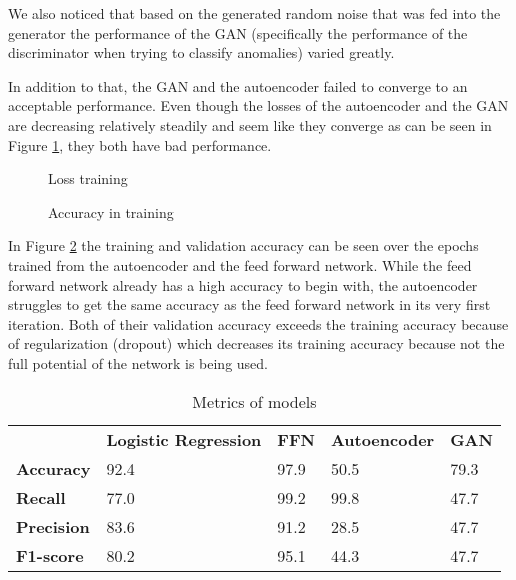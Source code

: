 \documentclass[]{article}
\begin{document}
	We also noticed that based on the generated random noise that was fed into the generator the performance of the GAN (specifically the performance of the discriminator when trying to classify anomalies) varied greatly. 
	\newline
	
	\noindent
	In addition to that, the GAN and the autoencoder failed to converge to an acceptable performance. Even though the losses of the autoencoder and the GAN are decreasing relatively steadily and seem like they converge as can be seen in Figure \ref{loss}, they both have bad performance.
	\newline
	
		\begin{figure}[!tbp]
		\centering
		\hfill
		\hfill
		\caption{Loss training}
		\label{loss}
	\end{figure}

	\begin{figure}[!tbp]
	\centering
	\hfill
	\caption{Accuracy in training}
	\label{accuracy}
	\end{figure}

	\noindent
	In Figure \ref{accuracy} the training and validation accuracy can be seen over the epochs trained from the autoencoder and the feed forward network. While the feed forward network already has a high accuracy to begin with, the autoencoder struggles to get the same accuracy as the feed forward network in its very first iteration. Both of their validation accuracy exceeds the training accuracy because of regularization (dropout) which decreases its training accuracy because not the full potential of the network is being used. 
	\newline
	
			\begin{table}[]
		\begin{tabular}{lllll}
			& \textbf{Logistic Regression} & \textbf{FFN} & \textbf{Autoencoder} & \textbf{GAN} \\
			\textbf{Accuracy}  & 92.4                       & 97.9        & 50.5             & 79.3      \\
			\textbf{Recall}    & 77.0                         & 99.2         & 99.8                 & 47.7        \\
			\textbf{Precision} & 83.6                         & 91.2          & 28.5                  & 47.7         \\
			\textbf{F1-score}  & 80.2                         & 95.1           & 44.3                   & 47.7        
		\end{tabular}
		\caption{Metrics of models}
		\label{table1}
	\end{table}
\end{document}
